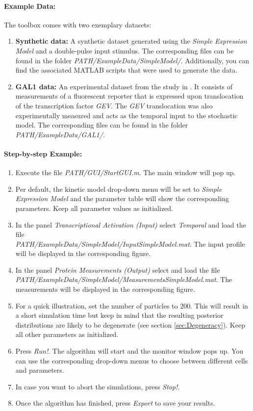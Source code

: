 \documentclass[a4paper, 9pt]{scrartcl}
\begin{document}
\paragraph{Example Data:} The toolbox comes with two exemplary datasets: 
\begin{enumerate}
	\item \textbf{Synthetic data:} A synthetic dataset generated using the \textit{Simple Expression Model} and a double-pulse input stimulus. The corresponding files can be found in the folder \textit{PATH/ExampleData/SimpleModel/}. Additionally, you can find the associated MATLAB scripts that were used to generate the data.
	\item \textbf{GAL1 data:} An experimental dataset from the study in \cite{Zechner2013}. It consists of measurements of a fluorescent reporter that is expressed upon translocation of the transcription factor \textit{GEV}. The \textit{GEV} translocation was also experimentally measured and acts as the temporal input to the stochastic model. The corresponding files can be found in the folder \textit{PATH/ExampleData/GAL1/}.
\end{enumerate}

\paragraph{Step-by-step Example:}
\begin{enumerate}
	\item Execute the file \textit{PATH/GUI/StartGUI.m}. The main window will pop up.
	\item Per default, the kinetic model drop-down menu will be set to \textit{Simple Expression Model} and the parameter table will show the corresponding parameters. Keep all parameter values as initialized.
	\item In the panel \textit{Transcriptional Activation (Input)} select \textit{Temporal} and load the file \\ \textit{PATH/ExampleData/SimpleModel/InputSimpleModel.mat}. The input profile will be displayed in the corresponding figure.
	\item In the panel \textit{Protein Measurements (Output)} select and load the file \\ \textit{PATH/ExampleData/SimpleModel/MeasurementsSimpleModel.mat}. The measurements will be displayed in the corresponding figure.
	\item For a quick illustration, set the number of particles to $200$. This will result in a short simulation time but keep in mind that the resulting posterior distributions are likely to be degenerate (see section \ref{sec:Degeneracy}). Keep all other parameters as initialized. 
	\item Press \textit{Run!}. The algorithm will start and the monitor window pops up. You can use the corresponding drop-down menus to choose between different cells and parameters. 
	\item In case you want to abort the simulations, press \textit{Stop!}.
	\item Once the algorithm has finished, press \textit{Export} to save your results.
\end{enumerate}
\end{document}
